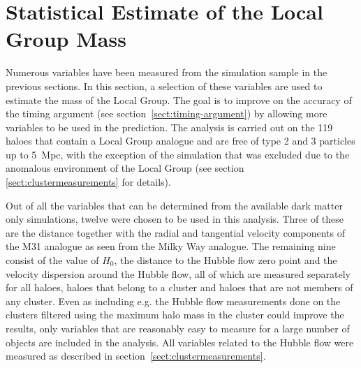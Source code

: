 \documentclass[english, oneside]{HYgradu}
\begin{document}



\section{Statistical Estimate of the Local Group Mass}\label{sect:statistical_estimate}
Numerous variables have been measured from the simulation sample in the previous sections. In this section, a selection of these variables are used to estimate the mass of the Local Group. The goal is to improve on the accuracy of the timing argument (see section~\ref{sect:timing-argument}) by allowing more variables to be used in the prediction. The analysis is carried out on the 119 haloes that contain a Local Group analogue and are free of type 2 and 3 particles up to 5~Mpc, with the exception of the simulation that was excluded due to the anomalous environment of the Local Group (see section \ref{sect:clustermeasurements} for details).

Out of all the variables that can be determined from the available dark matter only simulations, twelve were chosen to be used in this analysis. Three of these are the distance together with the radial and tangential velocity components of the M31 analogue as seen from the Milky Way analogue. The remaining nine consist of the value of $H_0$, the distance to the Hubble flow zero point and the velocity dispersion around the Hubble flow, all of which are measured separately for all haloes, haloes that belong to a cluster and haloes that are not members of any cluster. Even as including e.g. the Hubble flow measurements done on the clusters filtered using the maximum halo mass in the cluster could improve the results, only variables that are reasonably easy to measure for a large number of objects are included in the analysis. All variables related to the Hubble flow were measured as described in section~\ref{sect:clustermeasurements}.
\end{document}
